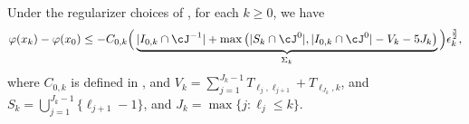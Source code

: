 \begin{proposition}
    \label{prop:proof/accumulated-descent}
    Under the regularizer choices of , 
    for each $k \geq 0$, we have
    \begin{align}
        \varphi(x_{k})
        - \varphi(x_0)
        \leq
         - C_{0,k}
        \Big (\underbrace{
            |I_{0,k} 
            \cap \cJ^{-1}|
            + \max\left( |S_k \cap \cJ^0|, |I_{0,k}
             \cap \cJ^0| - V_k - 5J_k \right)
            }_{\Sigma_k} \Big )
         \epsilon_k^{\frac{3}{2}}
         ,
        \label{eqn:newton-global-final-inequality}
    \end{align}
    where $C_{0,k}$ is defined in ,
    and $V_k = \sum_{j=1}^{J_k-1} T_{\ell_j,\ell_{j+1}} + T_{\ell_{J_k},k}$,
    and $S_k = \bigcup_{j=1}^{J_k-1}\{\ell_{j+1}-1\}$,
    and $J_k = \max\{ j : \ell_j \leq k \}$.
\end{proposition}
